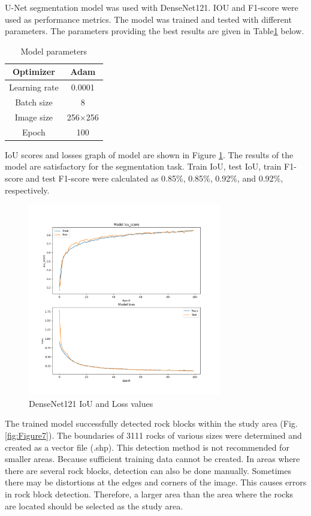 \documentclass[a4paper,fleqn]{cas-sc}
\begin{document}
U-Net segmentation model was used with DenseNet121. IOU and F1-score were used as performance metrics. The model was trained and tested with different parameters. The parameters providing the best results are given in Table\ref{tab:Table1} below.


\begin{table}
	\centering
	\caption{Model parameters}
	\label{tab:Table1}
	\begin{tabular}{ |c|c|} 
		\hline
		Optimizer&Adam\\ 
		\hline 
		Learning rate&0.0001\\
		\hline
		Batch size&8\\
		\hline
		Image size&256$\times$256\\
		\hline
		Epoch&100\\
		\hline
	\end{tabular} 
\end{table}


IoU scores and losses graph of model are shown in Figure \ref{fig:Figure6}. The results of the model are satisfactory for the segmentation task. Train IoU, test IoU, train F1-score and test F1-score were calculated as 0.85\%, 0.85\%, 0.92\%, and 0.92\%, respectively.

\begin{figure}
	\centering
	\includegraphics[width=0.75\textwidth]{figures/fig6.png}
	\caption{DenseNet121 IoU and Loss values}
	\label{fig:Figure6}
\end{figure}

The trained model successfully detected rock blocks within the study area (Fig. \ref{fig:Figure7}). The boundaries of 3111 rocks of various sizes were determined and created as a vector file (.shp). This detection method is not recommended for smaller areas. Because sufficient training data cannot be created. In areas where there are several rock blocks, detection can also be done manually. 
Sometimes there may be distortions at the edges and corners of the image. This causes errors in rock block detection. Therefore, a larger area than the area where the rocks are located should be selected as the study area.
\end{document}
